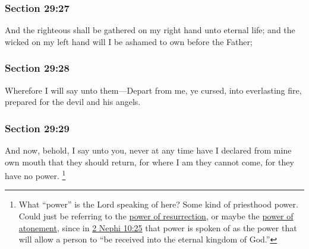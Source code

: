 	\subsubsection{Section 29:27} %
		\label{DC29-27}

		And the righteous shall be gathered on my right hand unto eternal life; and the wicked on my left hand will I be ashamed to own before the Father;


	\subsubsection{Section 29:28} %
		\label{DC29-28}

		Wherefore I will say unto them---Depart from me, ye cursed, into everlasting fire, prepared for the devil and his angels.


	\subsubsection{Section 29:29} %
		\label{DC29-29}

		And now, behold, I say unto you, never at any time have I declared from mine own mouth that they should return, for where I am they cannot come, for they have no power.%
			\footnote{%
				What ``power'' is the Lord speaking of here? Some kind of priesthood power. Could just be referring to the \hyperref[PRIESTHOOD-powers]{power of resurrection}, or maybe the \hyperref[PRIESTHOOD-powers]{power of atonement}, since in \hyperref[2NEPHI-10-25]{2 Nephi 10:25} that power is spoken of as the power that will allow a person to ``be received into the eternal kingdom of God.''
				}

